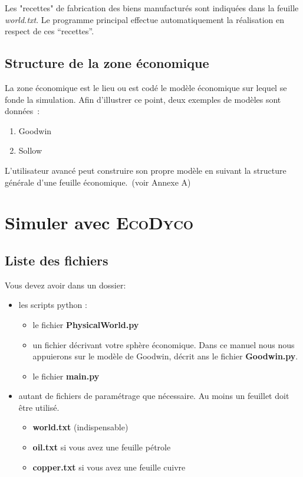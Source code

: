 \documentclass[12pt,a4paper]{article}%
\newcommand{\ed}{\textsc{EcoDyco}}
\begin{document}
Les "recettes" de fabrication des biens manufacturés sont indiquées dans la
feuille \textit{world.txt}. Le programme principal effectue automatiquement la
réalisation en respect de ces "`recettes"'.

\subsection{Structure de la zone économique}

La zone économique est le lieu ou est codé le modèle économique sur lequel
se fonde la simulation. Afin d'illustrer ce point, deux exemples de
modèles sont données~:

\begin{enumerate}
\item Goodwin

\item Sollow
\end{enumerate}

L'utilisateur avancé peut construire son propre modèle en suivant la
structure générale d'une feuille économique.~(voir Annexe A)

\section{Simuler avec \ed}

\subsection{Liste des fichiers}

Vous devez avoir dans un dossier:

\begin{itemize}
\item les scripts python :

\begin{itemize}
\item le fichier \textbf{PhysicalWorld.py}

\item un fichier décrivant votre sphère économique. Dans
ce manuel nous nous appuierons sur le modèle de Goodwin, décrit ans le fichier \textbf{Goodwin.py}.

\item le fichier \textbf{main.py}
\end{itemize}
\end{itemize}

\begin{itemize}
\item autant de fichiers de paramétrage que nécessaire. Au moins un feuillet doit être utilisé.

\begin{itemize}
\item \textbf{world.txt} (indispensable)

\item \textbf{oil.txt} si vous avez une feuille pétrole

\item \textbf{copper.txt} si vous avez une feuille cuivre

\end{itemize}
\end{itemize}
\end{document}
